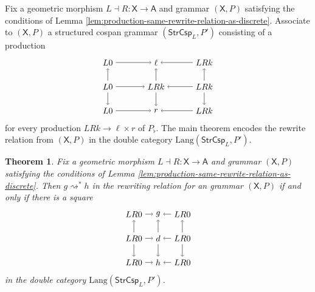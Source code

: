 \documentclass{amsart}
\newcommand{\A}{\cat{A}}
\newcommand{\X}{\cat{X}}
\newcommand{\StrCsp}{\cat{StrCsp}}
\newcommand{\Lang}{\mathrm{Lang}}
\newcommand{\cat}[1]{\mathsf{#1}}
\newcommand{\from}{\colon}
\newcommand{\deriv}[2]{#1 \rightsquigarrow^\ast #2}
\newtheorem{theorem}{Theorem}[section]
\theoremstyle{remark}
\theoremstyle{definition}
\begin{document}
Fix a geometric morphism $ L \dashv R \from \X \to \A $ and
grammar $ ( \X , P ) $ satisfying the conditions of Lemma
\ref{lem:production-same-rewrite-relation-as-discrete}.  Associate to
$ ( \X , P ) $ a structured cospan grammar $ ( \StrCsp_L , P' ) $
consisting of a production
%
\[
  \begin{tikzpicture}
    \node (1) at (0,2) {$ L 0 $};
    \node (2) at (2,2) {$ \ell $};
    \node (3) at (4,2) {$ LRk $};
    \node (4) at (0,1) {$ L 0 $};
    \node (5) at (2,1) {$ LRk $};
    \node (6) at (4,1) {$ LRk $};
    \node (7) at (0,0) {$ L 0 $};
    \node (8) at (2,0) {$ r $};
    \node (9) at (4,0) {$ LRk $};
    \draw [->] (1) to node [] {\scriptsize{$  $}} (2);
    \draw [->] (3) to node [] {\scriptsize{$  $}} (2);
    \draw [->] (4) to node [] {\scriptsize{$  $}} (5);
    \draw [->] (6) to node [] {\scriptsize{$  $}} (5);
    \draw [->] (7) to node [] {\scriptsize{$  $}} (8);
    \draw [->] (9) to node [] {\scriptsize{$  $}} (8);
    \draw [->] (4) to node [] {\scriptsize{$  $}} (1);
    \draw [->] (4) to node [] {\scriptsize{$  $}} (7);
    \draw [->] (5) to node [] {\scriptsize{$  $}} (2);
    \draw [->] (5) to node [] {\scriptsize{$  $}} (8);
    \draw [->] (6) to node [] {\scriptsize{$  $}} (3);
    \draw [->] (6) to node [] {\scriptsize{$  $}} (9);
  \end{tikzpicture}
\]
% 
for every production $ LRk \to \ell \times r $ of $ P_{\flat} $. The
main theorem encodes the rewrite relation from $ ( \X , P ) $ in the
double category $ \Lang ( \StrCsp_L , P' ) $.


\begin{theorem} \label{thm:inductive-rewriting}
  Fix a geometric morphism $ L \dashv R \from \X \to \A $ and grammar
  $ ( \X , P ) $ satisfying the conditions of Lemma
  \ref{lem:production-same-rewrite-relation-as-discrete}. Then
  $ \deriv{g}{h} $ in the rewriting relation for an grammar
  $ ( \X , P ) $ if and only if there is a square
  \[
    \begin{tikzpicture}
      \node (1t) at (0,2) {$ LR 0 $};
      \node (2t) at (1,2) {$ g $};
      \node (3t) at (2,2) {$ LR 0 $};
      \node (1m) at (0,1) {$ LR 0 $};
      \node (2m) at (1,1) {$ d $};
      \node (3m) at (2,1) {$ LR 0 $};
      \node (1b) at (0,0) {$ LR 0 $};
      \node (2b) at (1,0) {$ h $};
      \node (3b) at (2,0) {$ LR 0 $};
      \draw [->] (1t) to node [] {\scriptsize{$  $}} (2t);
      \draw [->] (3t) to node [] {\scriptsize{$  $}} (2t);
      \draw [->] (1m) to node [] {\scriptsize{$  $}} (2m);
      \draw [->] (3m) to node [] {\scriptsize{$  $}} (2m);
      \draw [->] (1b) to node [] {\scriptsize{$  $}} (2b);
      \draw [->] (3b) to node [] {\scriptsize{$  $}} (2b);
      \draw [->] (1m) to node [] {\scriptsize{$  $}} (1t);
      \draw [->] (1m) to node [] {\scriptsize{$  $}} (1b);
      \draw [->] (2m) to node [] {\scriptsize{$  $}} (2t);
      \draw [->] (2m) to node [] {\scriptsize{$  $}} (2b);
      \draw [->] (3m) to node [] {\scriptsize{$  $}} (3t);
      \draw [->] (3m) to node [] {\scriptsize{$  $}} (3b);
    \end{tikzpicture}
  \]
  in the double category $ \Lang ( \StrCsp_L , P' ) $.
\end{theorem}
\end{document}
